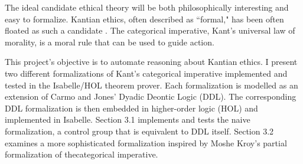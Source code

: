 \begin{isabellebody}
\begin{isamarkuptext}
The ideal candidate ethical theory will be both philosophically interesting and easy to 
formalize. Kantian ethics, often described as ``formal," has been often floated as such a candidate \cite{powers} \cite{BL}. 
The categorical imperative, Kant's universal law of morality, is a moral rule that can be used to 
guide action. 

This project's objective is to automate reasoning about Kantian ethics. I present two different
formalizations of Kant's categorical imperative implemented and tested in the Isabelle/HOL \cite{isabelle} theorem prover.
Each formalization is modelled as an extension of Carmo and Jones' Dyadic Deontic Logic (DDL). The corresponding 
DDL formalization is then embedded in higher-order logic (HOL) and implemented in Isabelle. Section 
3.1 implements and tests the naive formalization, a control group that is equivalent to DDL 
itself. Section 3.2 examines a more sophisticated formalization inspired by Moshe Kroy's partial 
formalization of thecategorical imperative. 


\end{isamarkuptext}
\end{isabellebody}
